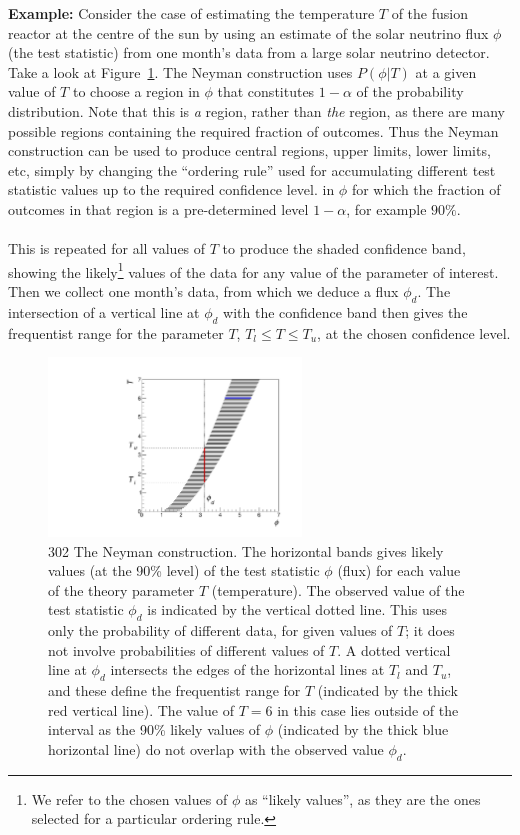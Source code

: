 \begin{tcolorbox}[colback=backblue]
\textbf{Example:} Consider the case of estimating the temperature $T$ of the fusion reactor
 at the centre of the sun by using an estimate of the solar neutrino flux $\phi$ (the test statistic) from one month's data
 from a large solar neutrino detector. Take a look at Figure~\ref{fig:neyman}. The Neyman construction uses $P(\phi|T)$ at a given value of $T$
 to choose a region in $\phi$ that constitutes $1 - \alpha$ of the probability distribution. Note that this is \emph{a} region, rather than \emph{the} region, as there are many
  possible regions containing the required fraction of outcomes. Thus the Neyman construction can be used to
 produce central regions, upper limits, lower limits, etc, simply by changing
  the ``ordering rule'' used for accumulating different test statistic values up to the required confidence level. in $\phi$  for which the fraction of outcomes in that region is a pre-determined level $1 - \alpha$, for example
  $90\%$. \\\\
  This is repeated for all values of $T$ to produce the shaded confidence band, showing the likely\footnote{We refer to the chosen values
  of $\phi$ as ``likely values'', as they are the ones selected for a particular ordering rule.}
  values of the data for any value of the parameter of interest. Then we collect one month's data, from which
  we deduce a flux $\phi_d$. The intersection of a vertical line at $\phi_d$ with the confidence band then
 gives the frequentist range for the parameter $T$, $T_{l} \leq T \leq T_{u}$, at the chosen  confidence level. 
\end{tcolorbox}
\begin{figure}[hbt!]
    \centering
    \includegraphics[width=0.6\textwidth]{figures/Intervals/neyman.pdf}
    \caption{302 The Neyman construction.  The horizontal bands gives likely values (at the 90\%
 level) of the test statistic $\phi$ (flux) for each value of the theory parameter $T$ (temperature).
 The  observed value of the test statistic $\phi_{d}$ is indicated by the vertical dotted line.
 This uses only the probability of different data, for given values of $T$;
 it does not involve probabilities of different values of $T$.
 A dotted vertical line at $\phi_{d}$ intersects
 the edges of the horizontal lines at $T_l$ and $T_u$, and these define the
 frequentist range for $T$ (indicated by the thick red vertical line). The value of $T=6$ in this case lies
 outside of the interval as the 90\% likely values of $\phi$ (indicated by the thick blue horizontal line) do not overlap with the observed value $\phi_{d}$. }
    \label{fig:neyman}
\end{figure}

